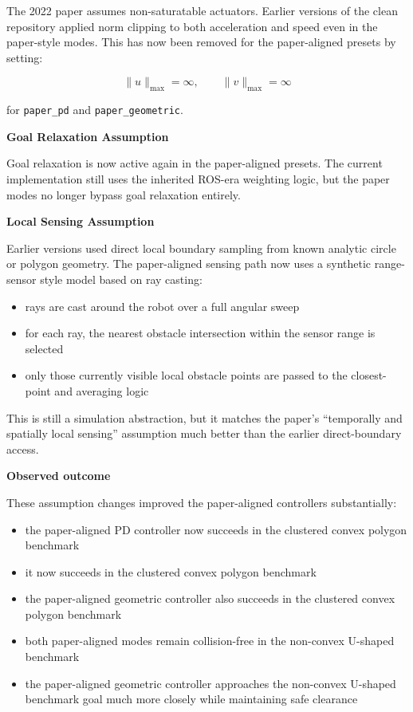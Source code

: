 \documentclass[11pt]{article}
\begin{document}
The 2022 paper assumes non-saturatable actuators. Earlier versions of the clean
repository applied norm clipping to both acceleration and speed even in the
paper-style modes. This has now been removed for the paper-aligned presets by
setting:

\begin{equation}
\lVert u \rVert_{\max} = \infty,
\qquad
\lVert v \rVert_{\max} = \infty
\end{equation}

for \texttt{paper\_pd} and \texttt{paper\_geometric}.

\textbf{Goal Relaxation Assumption}

Goal relaxation is now active again in the paper-aligned presets. The current
implementation still uses the inherited ROS-era weighting logic, but the paper
modes no longer bypass goal relaxation entirely.

\textbf{Local Sensing Assumption}

Earlier versions used direct local boundary sampling from known analytic circle
or polygon geometry. The paper-aligned sensing path now uses a synthetic
range-sensor style model based on ray casting:

\begin{itemize}[leftmargin=*]
  \item rays are cast around the robot over a full angular sweep
  \item for each ray, the nearest obstacle intersection within the sensor range is selected
  \item only those currently visible local obstacle points are passed to the closest-point and averaging logic
\end{itemize}

This is still a simulation abstraction, but it matches the paper's
``temporally and spatially local sensing'' assumption much better than the
earlier direct-boundary access.

\textbf{Observed outcome}

These assumption changes improved the paper-aligned controllers substantially:

\begin{itemize}[leftmargin=*]
  \item the paper-aligned PD controller now succeeds in the clustered convex polygon benchmark
  \item it now succeeds in the clustered convex polygon benchmark
  \item the paper-aligned geometric controller also succeeds in the clustered convex polygon benchmark
  \item both paper-aligned modes remain collision-free in the non-convex U-shaped benchmark
  \item the paper-aligned geometric controller approaches the non-convex U-shaped benchmark goal much more closely while maintaining safe clearance
\end{itemize}
\end{document}
